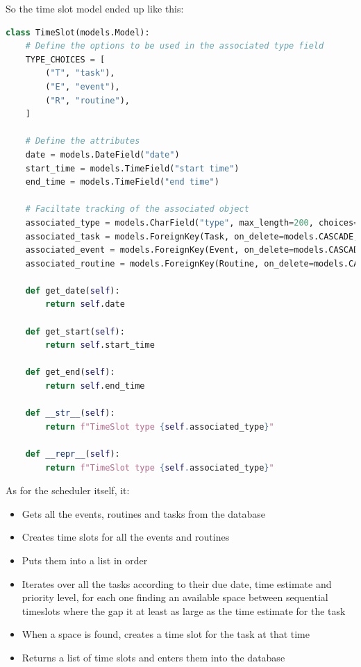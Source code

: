 \documentclass{article}
\begin{document}
So the time slot model ended up like this:
\begin{lstlisting}[language=Python]
class TimeSlot(models.Model):
    # Define the options to be used in the associated type field
    TYPE_CHOICES = [
        ("T", "task"),
        ("E", "event"),
        ("R", "routine"),
    ]

    # Define the attributes
    date = models.DateField("date")
    start_time = models.TimeField("start time")
    end_time = models.TimeField("end time")

    # Faciltate tracking of the associated object
    associated_type = models.CharField("type", max_length=200, choices=TYPE_CHOICES)
    associated_task = models.ForeignKey(Task, on_delete=models.CASCADE, null=True)
    associated_event = models.ForeignKey(Event, on_delete=models.CASCADE, null=True)
    associated_routine = models.ForeignKey(Routine, on_delete=models.CASCADE, null=True)

    def get_date(self):
        return self.date

    def get_start(self):
        return self.start_time

    def get_end(self):
        return self.end_time

    def __str__(self):
        return f"TimeSlot type {self.associated_type}"

    def __repr__(self):
        return f"TimeSlot type {self.associated_type}"
\end{lstlisting}

As for the scheduler itself, it:
\begin{samepage}
	\begin{itemize}
		\item Gets all the events, routines and tasks from the database
		\item Creates time slots for all the events and routines
		\item Puts them into a list in order
		\item Iterates over all the tasks according to their due date, time estimate and priority level,
		      for each one finding an available space between sequential timeslots
		      where the gap it at least as large as the time estimate for the task
		\item When a space is found, creates a time slot for the task at that time
		\item Returns a list of time slots and enters them into the database
	\end{itemize}
\end{samepage}
\end{document}
